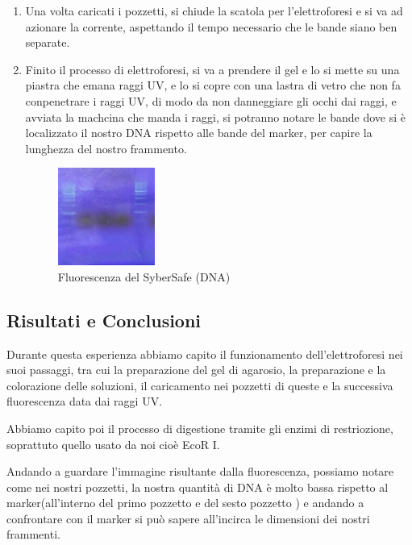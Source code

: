 \begin{enumerate}
	\item Una volta caricati i pozzetti, si chiude la scatola per l'elettroforesi e si va ad azionare la corrente, aspettando il tempo necessario che le bande siano ben separate.
	
	\item Finito il processo di elettroforesi, si va a prendere il gel e lo si mette su una piastra che emana raggi UV, e lo si copre con una lastra di vetro che non fa conpenetrare i raggi UV, di modo da non danneggiare gli occhi dai raggi, e avviata la machcina che manda i raggi, si potranno notare le bande dove si è localizzato il nostro DNA rispetto alle bande del marker, per capire la lunghezza del nostro frammento.
	
	\begin{figure}[H]
		
		\centering
		\includegraphics[width=0.3\textwidth]{./immagini/uv.jpg}
		\caption{Fluorescenza del SyberSafe (DNA)}
		\label{SyberSafe}
	
	\end{figure}
	


\end{enumerate}


\subsection{Risultati e Conclusioni}

Durante questa esperienza abbiamo capito il funzionamento dell'elettroforesi nei suoi passaggi, tra cui la preparazione del gel di agarosio, la preparazione e la colorazione delle soluzioni, il caricamento nei pozzetti di queste e la successiva fluorescenza data dai raggi UV. 

Abbiamo capito poi il processo di digestione tramite gli enzimi di restriozione, soprattuto quello usato da noi cioè EcoR I.

Andando a guardare l'immagine risultante dalla fluorescenza, possiamo notare come nei nostri pozzetti, la nostra quantità di DNA è molto bassa rispetto al marker(all'interno del primo pozzetto e del sesto pozzetto ) e andando a confrontare con il marker si può sapere all'incirca le dimensioni dei nostri frammenti. 
